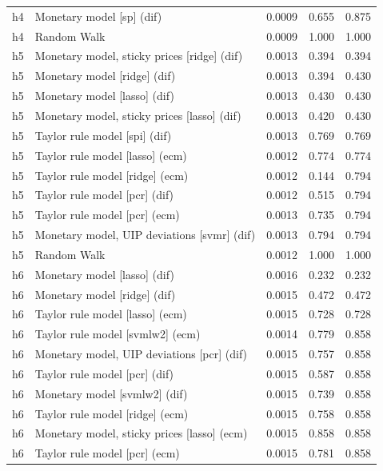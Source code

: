 \begin{ThreePartTable}
\begin{longtable}[t]{cp{5.5cm}ccc}
h4 & \raggedright Monetary model [sp] (dif) & 0.0009 & 0.655 & 0.875\\
h4 & \raggedright Random Walk & 0.0009 & 1.000 & 1.000\\
\addlinespace
h5 & \raggedright Monetary model, sticky prices [ridge] (dif) & 0.0013 & 0.394 & 0.394\\
h5 & \raggedright Monetary model [ridge] (dif) & 0.0013 & 0.394 & 0.430\\
h5 & \raggedright Monetary model [lasso] (dif) & 0.0013 & 0.430 & 0.430\\
h5 & \raggedright Monetary model, sticky prices [lasso] (dif) & 0.0013 & 0.420 & 0.430\\
h5 & \raggedright Taylor rule model [spi] (dif) & 0.0013 & 0.769 & 0.769\\
h5 & \raggedright Taylor rule model [lasso] (ecm) & 0.0012 & 0.774 & 0.774\\
h5 & \raggedright Taylor rule model [ridge] (ecm) & 0.0012 & 0.144 & 0.794\\
h5 & \raggedright Taylor rule model [pcr] (dif) & 0.0012 & 0.515 & 0.794\\
h5 & \raggedright Taylor rule model [pcr] (ecm) & 0.0013 & 0.735 & 0.794\\
h5 & \raggedright Monetary model, UIP deviations [svmr] (dif) & 0.0013 & 0.794 & 0.794\\
h5 & \raggedright Random Walk & 0.0012 & 1.000 & 1.000\\
\addlinespace
h6 & \raggedright Monetary model [lasso] (dif) & 0.0016 & 0.232 & 0.232\\
h6 & \raggedright Monetary model [ridge] (dif) & 0.0015 & 0.472 & 0.472\\
h6 & \raggedright Taylor rule model [lasso] (ecm) & 0.0015 & 0.728 & 0.728\\
h6 & \raggedright Taylor rule model [svmlw2] (ecm) & 0.0014 & 0.779 & 0.858\\
h6 & \raggedright Monetary model, UIP deviations [pcr] (dif) & 0.0015 & 0.757 & 0.858\\
h6 & \raggedright Taylor rule model [pcr] (dif) & 0.0015 & 0.587 & 0.858\\
h6 & \raggedright Monetary model [svmlw2] (dif) & 0.0015 & 0.739 & 0.858\\
h6 & \raggedright Taylor rule model [ridge] (ecm) & 0.0015 & 0.758 & 0.858\\
h6 & \raggedright Monetary model, sticky prices [lasso] (ecm) & 0.0015 & 0.858 & 0.858\\
h6 & \raggedright Taylor rule model [pcr] (ecm) & 0.0015 & 0.781 & 0.858\\

\end{longtable}
\end{ThreePartTable}
